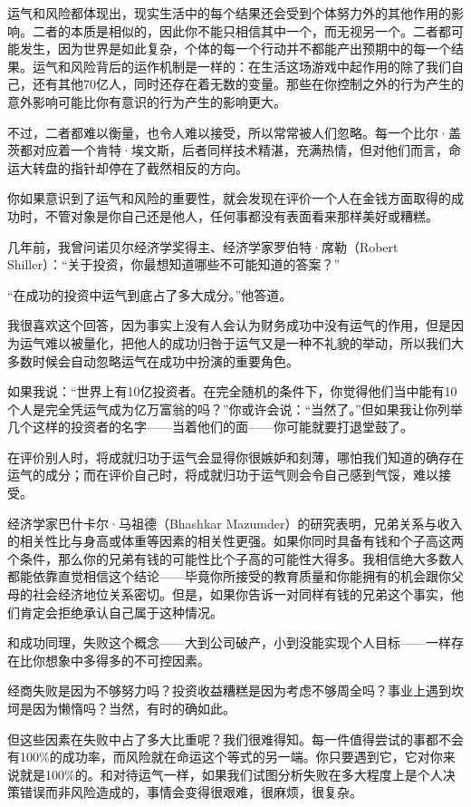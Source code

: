 运气和风险都体现出，现实生活中的每个结果还会受到个体努力外的其他作用的影响。二者的本质是相似的，因此你不能只相信其中一个，而无视另一个。二者都可能发生，因为世界是如此复杂，个体的每一个行动并不都能产出预期中的每一个结果。运气和风险背后的运作机制是一样的：在生活这场游戏中起作用的除了我们自己，还有其他70亿人，同时还存在着无数的变量。那些在你控制之外的行为产生的意外影响可能比你有意识的行为产生的影响更大。

不过，二者都难以衡量，也令人难以接受，所以常常被人们忽略。每一个比尔·盖茨都对应着一个肯特·埃文斯，后者同样技术精湛，充满热情，但对他们而言，命运大转盘的指针却停在了截然相反的方向。

你如果意识到了运气和风险的重要性，就会发现在评价一个人在金钱方面取得的成功时，不管对象是你自己还是他人，任何事都没有表面看来那样美好或糟糕。

几年前，我曾问诺贝尔经济学奖得主、经济学家罗伯特·席勒（Robert Shiller）：“关于投资，你最想知道哪些不可能知道的答案？”

“在成功的投资中运气到底占了多大成分。”他答道。

我很喜欢这个回答，因为事实上没有人会认为财务成功中没有运气的作用，但是因为运气难以被量化，把他人的成功归咎于运气又是一种不礼貌的举动，所以我们大多数时候会自动忽略运气在成功中扮演的重要角色。

如果我说：“世界上有10亿投资者。在完全随机的条件下，你觉得他们当中能有10个人是完全凭运气成为亿万富翁的吗？”你或许会说：“当然了。”但如果我让你列举几个这样的投资者的名字——当着他们的面——你可能就要打退堂鼓了。

在评价别人时，将成就归功于运气会显得你很嫉妒和刻薄，哪怕我们知道的确存在运气的成分；而在评价自己时，将成就归功于运气则会令自己感到气馁，难以接受。

经济学家巴什卡尔·马祖德（Bhashkar Mazumder）的研究表明，兄弟关系与收入的相关性比与身高或体重等因素的相关性更强。如果你同时具备有钱和个子高这两个条件，那么你的兄弟有钱的可能性比个子高的可能性大得多。我相信绝大多数人都能依靠直觉相信这个结论——毕竟你所接受的教育质量和你能拥有的机会跟你父母的社会经济地位关系密切。但是，如果你告诉一对同样有钱的兄弟这个事实，他们肯定会拒绝承认自己属于这种情况。

和成功同理，失败这个概念——大到公司破产，小到没能实现个人目标——一样存在比你想象中多得多的不可控因素。

经商失败是因为不够努力吗？投资收益糟糕是因为考虑不够周全吗？事业上遇到坎坷是因为懒惰吗？当然，有时的确如此。

但这些因素在失败中占了多大比重呢？我们很难得知。每一件值得尝试的事都不会有100\%的成功率，而风险就在命运这个等式的另一端。你只要遇到它，它对你来说就是100\%的。和对待运气一样，如果我们试图分析失败在多大程度上是个人决策错误而非风险造成的，事情会变得很艰难，很麻烦，很复杂。

